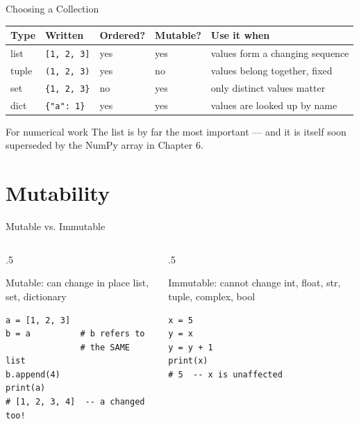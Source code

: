 \documentclass[9pt,aspectratio=169,xcolor=table]{beamer}
\newcommand{\striped}{\rowcolors{1}{white}{stripe}}
\begin{document}
\begin{frame}{Choosing a Collection}
    \leavevmode
    \small
    \striped
    \begin{center}
    \begin{tabular}{p{1.4cm}p{2.5cm}p{1.3cm}p{1.3cm}p{4.3cm}}
        \toprule
        \textbf{Type} & \textbf{Written} & \textbf{Ordered?} & \textbf{Mutable?} & \textbf{Use it when} \\
        \midrule
        list  & \texttt{[1, 2, 3]}   & yes & yes & values form a changing sequence \\
        tuple & \texttt{(1, 2, 3)}   & yes & no  & values belong together, fixed \\
        set   & \texttt{\{1, 2, 3\}} & no  & yes & only distinct values matter \\
        dict  & \texttt{\{"a": 1\}}  & yes & yes & values are looked up by name \\
        \bottomrule
    \end{tabular}
    \end{center}

    \vspace{2mm}
    \begin{block}{For numerical work}
        The \alert{list} is by far the most important --- and it is
        itself soon superseded by the NumPy \alert{array} in Chapter 6.
    \end{block}
\end{frame}

\section{Mutability}

\begin{frame}[fragile]{Mutable vs. Immutable}
    \leavevmode
    \begin{columns}[t]
        \begin{column}{.5\textwidth}
            \begin{block}{Mutable: can change in place}
                \scriptsize list, set, dictionary
            \end{block}
\begin{lstlisting}
a = [1, 2, 3]
b = a          # b refers to
               # the SAME list
b.append(4)
print(a)
# [1, 2, 3, 4]  -- a changed too!
\end{lstlisting}
        \end{column}
        \begin{column}{.5\textwidth}
            \begin{block}{Immutable: cannot change}
                \scriptsize int, float, str, tuple, complex, bool
            \end{block}
\begin{lstlisting}
x = 5
y = x
y = y + 1
print(x)
# 5  -- x is unaffected
\end{lstlisting}
        \end{column}
    \end{columns}
\end{frame}
\end{document}
